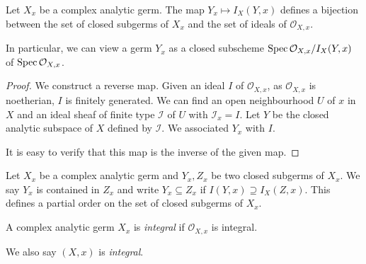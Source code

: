 \begin{proposition}\label{prop-bijsubgermideal}
    Let $X_x$ be a complex analytic germ.
    The map $Y_x\mapsto I_X(Y,x)$ defines a bijection between the set of closed subgerms of $X_x$ and the set of ideals of $\mathcal{O}_{X,x}$.
\end{proposition}
In particular, we can view a germ $Y_x$ as a closed subscheme $\operatorname{Spec} \mathcal{O}_{X,x}/I_X(Y,x)$ of $\operatorname{Spec} \mathcal{O}_{X,x}$.
\begin{proof}
    We construct a reverse map. Given an ideal $I$ of $\mathcal{O}_{X,x}$, as $\mathcal{O}_{X,x}$ is noetherian, $I$ is finitely generated. We can find an open neighbourhood $U$ of $x$ in $X$ and an ideal sheaf of finite type $\mathcal{I}$ of $U$ with $\mathcal{I}_x=I$. Let $Y$ be the closed analytic subspace of $X$ defined by $\mathcal{I}$. We associated $Y_x$ with $I$. 
    
    It is easy to verify that this map is the inverse of the given map.
\end{proof}

\begin{definition}
    Let $X_x$ be a complex analytic germ and $Y_x, Z_x$ be two closed subgerms of $X_x$. We say $Y_x$ is contained in $Z_x$ and write
    $Y_x\subseteq Z_x$ if $I(Y,x)\supseteq I_X(Z,x)$. This defines a partial order on the set of closed subgerms of $X_x$.
\end{definition}

\begin{definition}\label{def-integralgerm}
    A complex analytic germ $X_x$ is \emph{integral} if $\mathcal{O}_{X,x}$ is integral.

    We also say $(X,x)$ is \emph{integral}.
\end{definition}

